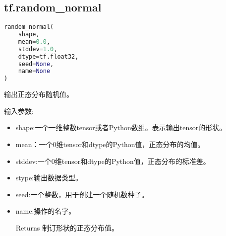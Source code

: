 \subsection{tf.random\_normal}
\begin{lstlisting}[language=Python]
random_normal(
    shape,
    mean=0.0,
    stddev=1.0,
    dtype=tf.float32,
    seed=None,
    name=None
)
\end{lstlisting}
输出正态分布随机值。

输入参数:
\begin{itemize}
\item shape:一个一维整数tensor或者Python数组。表示输出tensor的形状。
\item mean：一个0维tensor和dtype的Python值，正态分布的均值。
\item stddev:一个0维tensor和dtype的Python值，正态分布的标准差。
\item stype:输出数据类型。
\item seed:一个整数，用于创建一个随机数种子。
\item name:操作的名字。
\item[Returns] 制订形状的正态分布值。
\end{itemize}

